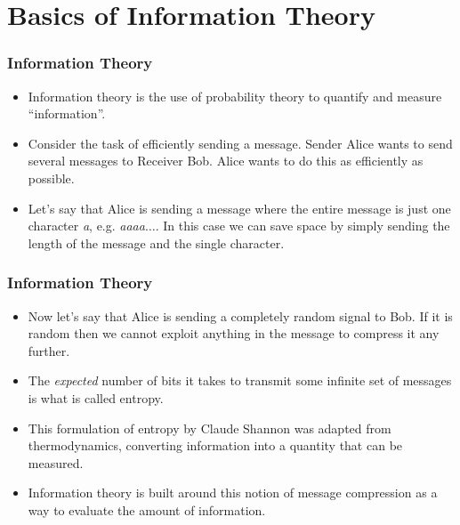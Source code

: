 \documentclass[handout]{beamer}
\begin{document}
\section{Basics of Information Theory}
\frame{\tableofcontents[currentsection]}

\begin{frame}
\frametitle{Information Theory}
\begin{itemize}[<+->]
\item Information theory is the use of probability theory to quantify
  and measure ``information''.
\item Consider the task of efficiently sending a message. Sender Alice
  wants to send several messages to Receiver Bob. Alice wants to do
  this as efficiently as possible.
\item Let's say that Alice is sending a message where the entire
  message is just one character {\em a}, e.g. {\em aaaa$\ldots$}. In
  this case we can save space by simply sending the length of the
  message and the single character.
\end{itemize}

\end{frame}

\begin{frame}
\frametitle{Information Theory}
\begin{itemize}[<+->]
\item Now let's say that Alice is sending a completely random signal to
  Bob. If it is random then we cannot exploit anything in the message
  to compress it any further.
\item The {\em expected} number of bits it takes to transmit
  some infinite set of messages is what is called entropy. 
\item This formulation of entropy by Claude Shannon was adapted from
  thermodynamics, converting information into a quantity that can be measured.
\item Information theory is built around this notion of message
  compression as a way to evaluate the amount of information. 
\end{itemize}

\end{frame}
\end{document}
